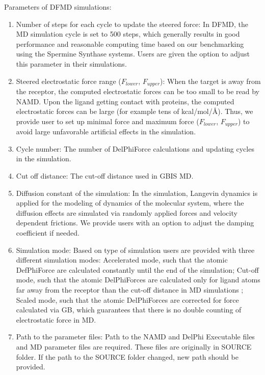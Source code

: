\documentclass[9pt,tutorial,pubversion]{livecoms}
\begin{document}
Parameters of DFMD simulations:
\begin{enumerate}
\item Number of steps for each cycle to update the steered force: In DFMD, the MD simulation cycle is set to 500 steps, which generally results in good performance and reasonable computing time based on our benchmarking using the Spermine Synthase systems. Users are given the option to adjust this parameter in their simulations.

\item Steered electrostatic force range ($ F_{lower} $, $ F_{upper} $): When the target is away from the receptor, the computed electrostatic forces can be too small to be read by NAMD. Upon the ligand getting contact with proteins, the computed electrostatic forces can be large (for example tens of kcal/mol/Å). Thus, we provide user to set up minimal force and maximum force ($ F_{lower} $, $ F_{upper}$) to avoid large unfavorable artificial effects in the simulation.

\item Cycle number: The number of DelPhiForce calculations and updating cycles in the simulation.

\item Cut off distance: The cut-off distance used in GBIS MD.

\item Diffusion constant of the simulation: In the simulation, Langevin dynamics is applied for the modeling of dynamics of the molecular system, where the diffusion effects are simulated via randomly applied forces and velocity dependent frictions. We provide users with an option to adjust the damping coefficient if needed.

\item Simulation mode: Based on type of simulation users are provided with three different simulation modes: Accelerated mode, such that the atomic DefPhiForce are calculated constantly until the end of the simulation; Cut-off mode, such that the atomic DelPhiForces are calculated only for ligand atoms far away from the receptor than the cut-off distance in MD simulations ; Scaled mode, such that the atomic DelPhiForces are corrected for force calculated via GB, which guarantees that there is no double counting of electrostatic force in MD.

\item Path to the parameter files: Path to the NAMD and DelPhi Executable files and MD parameter files are required. These files are originally in SOURCE folder. If the path to the SOURCE folder changed, new path should be provided.


\end{enumerate}
\end{document}
